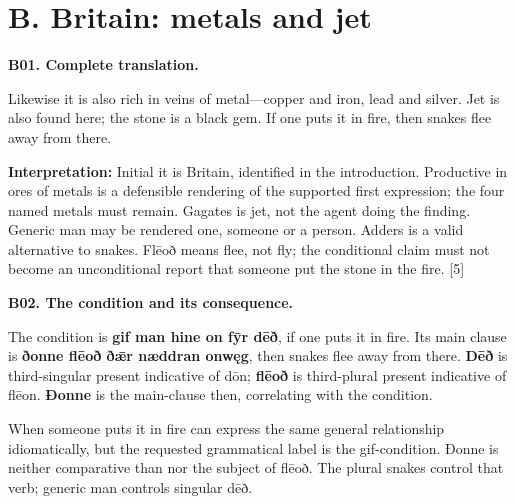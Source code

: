 \section*{B. Britain: metals and jet}

\par\begin{minipage}{\linewidth}\raggedright
\textbf{B01. Complete translation.}

Likewise it is also rich in veins of metal—copper and iron, lead and silver. Jet is also found here; the stone is a black gem. If one puts it in fire, then snakes flee away from there.

\textbf{Interpretation:} Initial it is Britain, identified in the introduction. Productive in ores of metals is a defensible rendering of the supported first expression; the four named metals must remain. Gagates is jet, not the agent doing the finding. Generic man may be rendered one, someone or a person. Adders is a valid alternative to snakes. Flēoð means flee, not fly; the conditional claim must not become an unconditional report that someone put the stone in the fire. [5]

\end{minipage}\par\addvspace{4pt}

\par\begin{minipage}{\linewidth}\raggedright
\textbf{B02. The condition and its consequence.}

The condition is \textbf{gif man hine on fȳr dēð}, if one puts it in fire. Its main clause is \textbf{ðonne flēoð ðǣr næddran onwęg}, then snakes flee away from there. \textbf{Dēð} is third-singular present indicative of dōn; \textbf{flēoð} is third-plural present indicative of flēon. \textbf{Ðonne} is the main-clause then, correlating with the condition.

When someone puts it in fire can express the same general relationship idiomatically, but the requested grammatical label is the gif-condition. Ðonne is neither comparative than nor the subject of flēoð. The plural snakes control that verb; generic man controls singular dēð.

\end{minipage}\par\addvspace{4pt}


